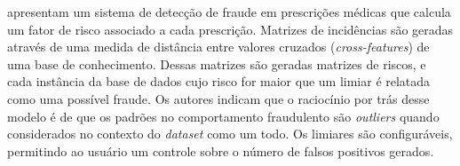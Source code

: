 \citet{Aral2011} apresentam um sistema de detecção de fraude em prescrições médicas que calcula um fator de risco associado a cada prescrição. Matrizes de incidências são geradas através de uma medida de distância entre valores cruzados (\emph{cross-features}) de uma base de conhecimento. Dessas matrizes são geradas matrizes de riscos, e cada instância da base de dados cujo risco for maior que um limiar é relatada como uma possível fraude. Os autores indicam que o raciocínio por trás desse modelo é de que os padrões no comportamento fraudulento são \emph{outliers} quando considerados no contexto do \emph{dataset} como um todo. Os limiares são configuráveis, permitindo ao usuário um controle sobre o número de falsos positivos gerados.

\fi
